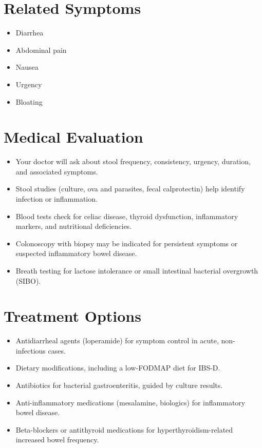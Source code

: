 \section*{Related Symptoms}
\begin{itemize}
  \item Diarrhea
  \item Abdominal pain
  \item Nausea
  \item Urgency
  \item Bloating
\end{itemize}


\section*{Medical Evaluation}
\begin{itemize}
  \item Your doctor will ask about stool frequency, consistency, urgency, duration, and associated symptoms.
  \item Stool studies (culture, ova and parasites, fecal calprotectin) help identify infection or inflammation.
  \item Blood tests check for celiac disease, thyroid dysfunction, inflammatory markers, and nutritional deficiencies.
  \item Colonoscopy with biopsy may be indicated for persistent symptoms or suspected inflammatory bowel disease.
  \item Breath testing for lactose intolerance or small intestinal bacterial overgrowth (SIBO).
\end{itemize}

\section*{Treatment Options}
\begin{itemize}
  \item Antidiarrheal agents (loperamide) for symptom control in acute, non-infectious cases.
  \item Dietary modifications, including a low-FODMAP diet for IBS-D.
  \item Antibiotics for bacterial gastroenteritis, guided by culture results.
  \item Anti-inflammatory medications (mesalamine, biologics) for inflammatory bowel disease.
  \item Beta-blockers or antithyroid medications for hyperthyroidism-related increased bowel frequency.
\end{itemize}


